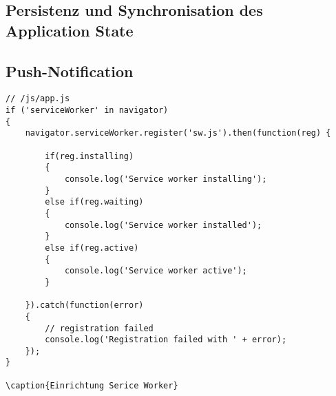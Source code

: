 \subsection{Persistenz und Synchronisation des Application State}





\subsection{Push-Notification}


\begin{lstlisting}
// /js/app.js
if ('serviceWorker' in navigator)
{
    navigator.serviceWorker.register('sw.js').then(function(reg) {

        if(reg.installing)
        {
            console.log('Service worker installing');
        } 
        else if(reg.waiting)
        {
            console.log('Service worker installed');
        } 
        else if(reg.active)
        {
            console.log('Service worker active');
        }

    }).catch(function(error)
    {
        // registration failed
        console.log('Registration failed with ' + error);
    });
}

\caption{Einrichtung Serice Worker}
\end{lstlisting}
